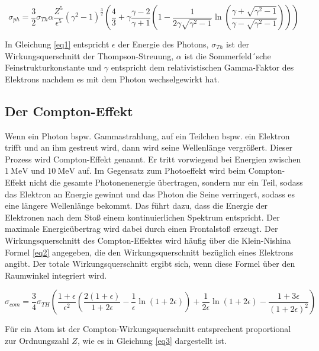 \begin{equation}
    \sigma_{ph} = \frac{3}{2} \sigma_{Th} \alpha \frac{Z^5}{\epsilon^5} (\gamma^2 -1)^{\frac{3}{2}} \left(\frac{4}{3} + \gamma\frac{\gamma -2}{\gamma+1} \left(1 - \frac{1}{2 \gamma \sqrt{\gamma^2 -1}} \ln\left(\frac{\gamma + \sqrt{\gamma^2 - 1}}{\gamma - \sqrt{\gamma^2 -1}} \right) \right) \right)
    \label{eq1}
\end{equation}

In Gleichung \ref{eq1} entspricht $\epsilon$ der Energie des Photons, $\sigma_{Th}$
ist der Wirkungsquerschnitt der Thompson-Streuung, $\alpha$ ist die 
Sommerfeld´sche Feinstrukturkonstante und $\gamma$ entspricht dem relativistischen 
Gamma-Faktor des Elektrons nachdem es mit dem Photon wechselgewirkt hat.

\subsection{Der Compton-Effekt}
Wenn ein Photon bspw. Gammastrahlung, auf ein Teilchen bspw. ein Elektron trifft
und an ihm gestreut wird, dann wird seine Wellenlänge vergrößert. 
Dieser Prozess wird Compton-Effekt genannt.
Er tritt vorwiegend bei Energien zwischen $\SI{1}{\mega\electronvolt}$ und 
$\SI{10}{\mega\electronvolt}$ auf.
Im Gegensatz zum Photoeffekt wird beim Compton-Effekt nicht die 
gesamte Photonenenergie übertragen, sondern nur ein Teil, sodass das Elektron an 
Energie gewinnt und das Photon die Seine verringert, sodass es eine längere 
Wellenlänge bekommt. Das führt dazu, dass die Energie der Elektronen nach dem 
Stoß einem kontinuierlichen Spektrum entspricht.
Der maximale Energieübertrag wird dabei durch einen Frontalstoß erzeugt.
Der Wirkungsquerschnitt des Compton-Effektes wird häufig über die 
Klein-Nishina Formel \ref{eq2} angegeben, die den Wirkungsquerschnitt bezüglich 
eines Elektrons angibt. Der totale Wirkungsquerschnitt ergibt sich, wenn diese 
Formel über den Raumwinkel integriert wird.

\begin{equation}
    \sigma_{com} = \frac{3}{4}\sigma_{TH} \left(\frac{1 + \epsilon}{\epsilon^2} \left(\frac{2(1+\epsilon)}{1+2\epsilon} - \frac{1}{\epsilon} \ln(1+2\epsilon) \right) + \frac{1}{2\epsilon} \ln(1+2\epsilon) - \frac{1+3\epsilon}{(1+2\epsilon)^2} \right)
    \label{eq2}
\end{equation}

Für ein Atom ist der Compton-Wirkungsquerschnitt entsprechent proportional zur 
Ordnungszahl $Z$, wie es in Gleichung \ref{eq3} dargestellt ist.

